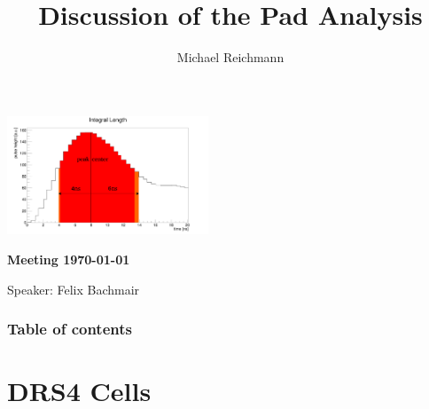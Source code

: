 \documentclass[9pt]{beamer}
\title[Analysis]{Discussion of the Pad Analysis}
\author[M. Reichmann]{Michael Reichmann}
\institute[\textbf{\textit{ETH}}\scalebox{.6}{\textit{Z\"{u}rich}}]{Swiss Federal Institute of Technology Zurich}
\begin{document}
\begin{frame}
	\begin{center}
		\includegraphics[width=6cm]{IntegralLength}
	\end{center}
	\begin{alertblock}{
		\begin{center}
			\textbf{Meeting \today}
		\end{center}}
		\vspace*{10pt}
		\begin{center}\small
		Speaker: Felix Bachmair
		\end{center}\normalsize
	\end{alertblock}
\end{frame}
\begin{frame}[allowframebreaks]
	\frametitle{Table of contents}
	\tableofcontents   %
\end{frame}
\section{DRS4 Cells}
\end{document}
